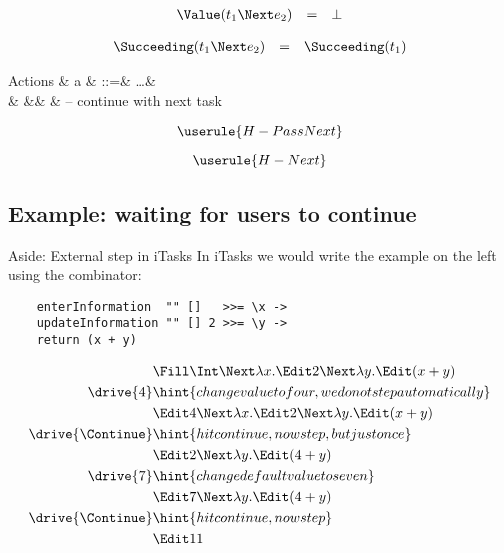 \begin{equation*}
  \begin{array}{lcl}
    \Value(t_1 \Next e_2) &=& \bot
  \end{array}
\end{equation*}

\begin{equation*}
  \begin{array}{lcl}
    \Succeeding(t_1 \Next e_2) &=& \Succeeding(t_1)
  \end{array}
\end{equation*}

\begin{grammar}
  Actions
    & a & ::=& \ldots & \\
    &   &\mid& \Continue  & – continue with next task \\
\end{grammar}

\begin{equation*}
  \userule{H-PassNext}
\end{equation*}

\begin{equation*}
  \userule{H-Next}
\end{equation*}


\subsection{Example: waiting for users to continue}

\begin{margintext}{Aside: External step in iTasks}
  In iTasks we would write the example on the left using the \type{>>=} combinator:
  \begin{verbatim}
    enterInformation  "" []   >>= \x ->
    updateInformation "" [] 2 >>= \y ->
    return (x + y)
  \end{verbatim}
\end{margintext}

\begin{align*}
    & \Fill \Int \Next \lambda x. \Edit 2 \Next \lambda y. \Edit (x + y) \\
  \drive{4} & \hint{change value to four, we do not step automatically} \\
    & \Edit 4 \Next \lambda x. \Edit 2 \Next \lambda y. \Edit (x + y) \\
  \drive{\Continue} & \hint{hit continue, now step, but just once} \\
    & \Edit 2 \Next \lambda y. \Edit (4 + y) \\
  \drive{7} & \hint{change default value to seven} \\
    & \Edit 7 \Next \lambda y. \Edit (4 + y) \\
  \drive{\Continue} & \hint{hit continue, now step} \\
    & \Edit 11 \\
\end{align*}
